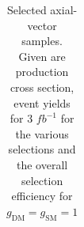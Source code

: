 \begin{table}[h]
\begin{tabular}{lllllll}
\hline
\hline
\end{tabular}
\caption{Selected axial-vector samples. Given are production cross section, event yields for 3 $fb^{-1 }$ for the various selections and the overall selection efficiency for $g_\textrm{DM}=g_\textrm{SM}=1$}
\label{tab:dm_A_g1_3fb}
\end{table}


